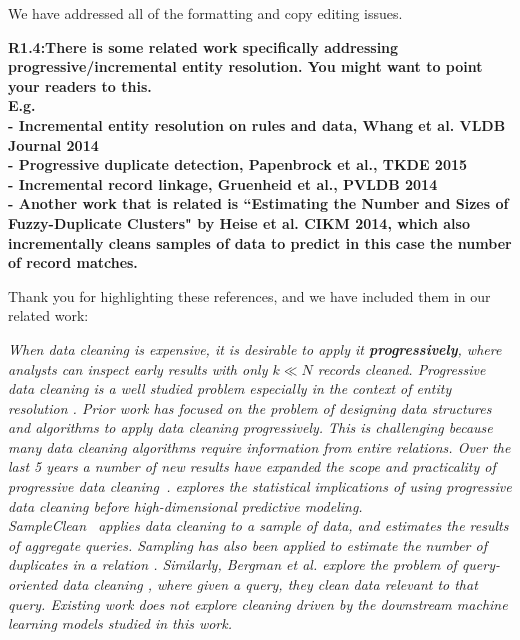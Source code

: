 \noindent We have addressed all of the formatting and copy editing issues.

\vspace{0.5em}

\noindent\textbf{R1.4:There is some related work specifically addressing progressive/incremental entity resolution. You might want to point your readers to this.
\\E.g.
\\- Incremental entity resolution on rules and data, Whang et al. VLDB Journal 2014
\\- Progressive duplicate detection, Papenbrock et al., TKDE 2015
\\- Incremental record linkage, Gruenheid et al., PVLDB 2014
\\- Another work that is related is ``Estimating the Number and Sizes of Fuzzy-Duplicate Clusters" by Heise et al. CIKM 2014, which also incrementally cleans samples of data to predict in this case the number of record matches.}

Thank you for highlighting these references, and we have included them in our related work:

\emph{When data cleaning is expensive, it is desirable to apply it \textbf{progressively}, where analysts can inspect early results with only $k \ll N$ records cleaned.
Progressive data cleaning is a well studied problem especially in the context of entity resolution \cite{altowim2014progressive, whang2014incremental, papenbrock2015progressive, gruenheid2014incremental}.
Prior work has focused on the problem of designing data structures and algorithms to apply data cleaning progressively.
This is challenging because many data cleaning algorithms require information from entire relations.
Over the last 5 years a number of new results have expanded the scope and practicality of progressive data cleaning~\cite{mayfield2010eracer, DBLP:journals/pvldb/YakoutENOI11, yakout2013don}.
\sys explores the statistical implications of using progressive data cleaning before high-dimensional predictive modeling.
\\
SampleClean~\cite{wang1999sample} applies data cleaning to a sample of data, and estimates the results of aggregate queries.
Sampling has also been applied to estimate the number of duplicates in a relation \cite{heise2014estimating}. 
Similarly, Bergman et al. explore the problem of query-oriented data cleaning \cite{DBLP:conf/sigmod/BergmanMNT15}, where given a query, they clean data relevant to that query. 
Existing work does not explore cleaning driven by the downstream machine learning models studied in this work.}

